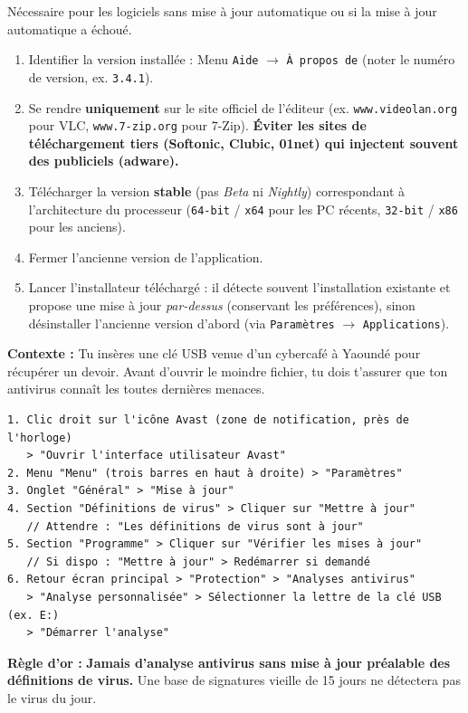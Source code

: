 \documentclass[11pt]{article}
\begin{document}
\begin{methode}
Nécessaire pour les logiciels sans mise à jour automatique ou si la mise à jour automatique a échoué.
\begin{enumerate}
    \item Identifier la version installée : Menu \texttt{Aide} $\to$ \texttt{À propos de} (noter le numéro de version, ex. \texttt{3.4.1}).
    \item Se rendre \textbf{uniquement} sur le site officiel de l'éditeur (ex. \texttt{www.videolan.org} pour VLC, \texttt{www.7-zip.org} pour 7-Zip). \textbf{Éviter les sites de téléchargement tiers (Softonic, Clubic, 01net) qui injectent souvent des publiciels (adware).}
    \item Télécharger la version \textbf{stable} (pas \emph{Beta} ni \emph{Nightly}) correspondant à l'architecture du processeur (\texttt{64-bit} / \texttt{x64} pour les PC récents, \texttt{32-bit} / \texttt{x86} pour les anciens).
    \item Fermer l'ancienne version de l'application.
    \item Lancer l'installateur téléchargé : il détecte souvent l'installation existante et propose une mise à jour \emph{par-dessus} (conservant les préférences), sinon désinstaller l'ancienne version d'abord (via \texttt{Paramètres} $\to$ \texttt{Applications}).
\end{enumerate}
\end{methode}

\begin{exemplebox}
\textbf{Contexte :} Tu insères une clé USB venue d'un cybercafé à Yaoundé pour récupérer un devoir. Avant d'ouvrir le moindre fichier, tu dois t'assurer que ton antivirus connaît les toutes dernières menaces.

\begin{lstlisting}[language=text, caption=Étapes de mise à jour Avast (interface graphique)]
1. Clic droit sur l'icône Avast (zone de notification, près de l'horloge)
   > "Ouvrir l'interface utilisateur Avast"
2. Menu "Menu" (trois barres en haut à droite) > "Paramètres"
3. Onglet "Général" > "Mise à jour"
4. Section "Définitions de virus" > Cliquer sur "Mettre à jour"
   // Attendre : "Les définitions de virus sont à jour"
5. Section "Programme" > Cliquer sur "Vérifier les mises à jour"
   // Si dispo : "Mettre à jour" > Redémarrer si demandé
6. Retour écran principal > "Protection" > "Analyses antivirus"
   > "Analyse personnalisée" > Sélectionner la lettre de la clé USB (ex. E:)
   > "Démarrer l'analyse"
\end{lstlisting}

\textbf{Règle d'or :} \textbf{Jamais d'analyse antivirus sans mise à jour préalable des définitions de virus.} Une base de signatures vieille de 15 jours ne détectera pas le virus du jour.
\end{exemplebox}
\end{document}
